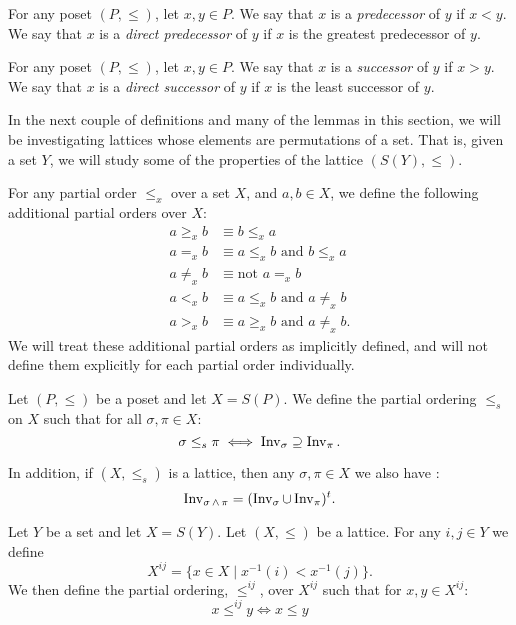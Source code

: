 	\begin{definition}
		For any poset $(P, \le)$, let $x,y \in P$. We say that $x$ is a \emph{predecessor} of $y$ if $x < y$. We say that $x$ is a \emph{direct predecessor} of $y$ if $x$ is the greatest predecessor of $y$.
	\end{definition}

	\begin{definition}
		For any poset $(P, \le)$, let $x,y \in P$. We say that $x$ is a \emph{successor} of $y$ if $x > y$. We say that $x$ is a \emph{direct successor} of $y$ if $x$ is the least successor of $y$.
	\end{definition}

	In the next couple of definitions and many of the lemmas in this section, we will be investigating lattices whose elements are permutations of a set. That is, given a set $Y$, we will study some of the properties of the lattice $(S(Y), \le)$.

	\begin{definition}
		For any partial order $\le_x$ over a set $X$, and $a, b \in X$, we define the following additional partial orders over $X$:
		\begin{align*}
			a \ge_x b &\equiv b \le_x a \\
			a =_x b &\equiv a \le_x b \text{ and } b \le_x a \\
			a \ne_x b &\equiv \text{not } a =_x b \\
			a <_x b &\equiv a \le_x b \text{ and } a \ne_x b \\
			a >_x b &\equiv a \ge_x b \text{ and } a \ne_x b.
		\end{align*}
		We will treat these additional partial orders as implicitly defined, and will not define them explicitly for each partial order individually.
	\end{definition}

	\begin{definition}[$\le_s$]
		\label{partial-order-s-definition}
		Let $(P, \le)$ be a poset and let $X = S(P)$. We define the partial ordering $\le_s$ on $X$ such that for all $\sigma, \pi \in X$:
		\[
			\sigma \le_s \pi \iff \operatorname{Inv}_{\sigma} \supseteq \operatorname{Inv}_{\pi}.
		\]

		In addition, if $(X, \le_s)$ is a lattice, then any $\sigma, \pi \in X$ we also have \cite{markowsky1994permutation}:
		\[
			\operatorname{Inv}_{\sigma \operatorname{\wedge} \pi} = (\operatorname{Inv}_{\sigma} \cup \operatorname{Inv}_{\pi})^t.
		\]
	\end{definition}

	\begin{definition}[$X^{ij}, \le^{ij}$]
		\label{identified-lattice-definition}
		Let $Y$ be a set and let $X = S(Y)$. Let $(X, \le)$ be a lattice. For any $i,j \in Y$ we define
		\[
			X^{ij} = \{ x \in X \mid x^{-1}(i) < x^{-1}(j) \}.
		\]
		We then define the partial ordering, $\le^{ij}$, over $X^{ij}$ such that for $x, y \in X^{ij}$:
		\[
			x \le^{ij} y \iff x \le y
		\]
	\end{definition}

